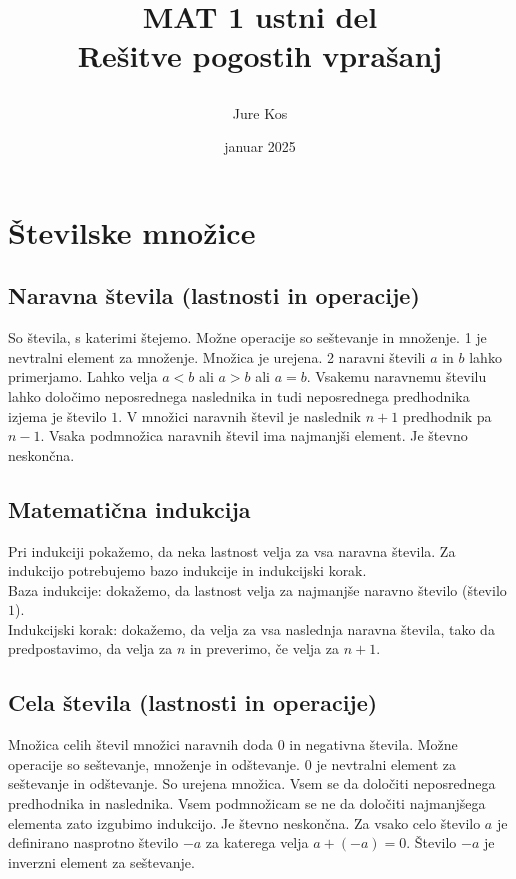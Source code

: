 \documentclass[12pt]{report}
\title{

  {MAT 1 ustni del}\\
  {\small Rešitve pogostih vprašanj}\\

}
\date{januar 2025}
\author{Jure Kos}
\begin{document}
\maketitle

\chapter*{Številske množice}

\section*{Naravna števila (lastnosti in operacije)}
So števila, s katerimi štejemo. Možne operacije so seštevanje in množenje. 1 je nevtralni element za množenje. Množica je urejena. 2 naravni števili $a$ in $b$ lahko primerjamo. Lahko velja $a<b$ ali $a>b$ ali $a=b$. Vsakemu naravnemu številu lahko določimo neposrednega naslednika in tudi neposrednega predhodnika izjema je število $1$. V množici naravnih števil je naslednik $n+1$ predhodnik pa $n-1$. Vsaka podmnožica naravnih števil ima najmanjši element. Je števno neskončna.

\section*{Matematična indukcija}
Pri indukciji pokažemo, da neka lastnost velja za vsa naravna števila. Za indukcijo potrebujemo bazo indukcije in indukcijski korak.\\
\bigbreak
Baza indukcije: dokažemo, da lastnost velja za najmanjše naravno število (število $1$).\\
\bigbreak
Indukcijski korak: dokažemo, da velja za vsa naslednja naravna števila, tako da predpostavimo, da velja za $n$ in preverimo, če velja za $n+1$.

\section*{Cela števila (lastnosti in operacije)}
Množica celih števil množici naravnih doda $0$ in negativna števila. Možne operacije so seštevanje, množenje in odštevanje. $0$ je nevtralni element za seštevanje in odštevanje. So urejena množica. Vsem se da določiti neposrednega predhodnika in naslednika. Vsem podmnožicam se ne da določiti najmanjšega elementa zato izgubimo indukcijo. Je števno neskončna. Za vsako celo število $a$ je definirano nasprotno število $-a$ za katerega velja $a+(-a)=0$. Število $-a$ je inverzni element za seštevanje.
		
\end{document}
